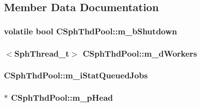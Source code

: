 \subsection{Member Data Documentation}
\hypertarget{classCSphThdPool_a2daa42b46c298c5b0f6875ad62f6ade6}{
\subsubsection[{m\-\_\-b\-Shutdown}]{\setlength{\rightskip}{0pt plus 5cm}volatile bool C\-Sph\-Thd\-Pool\-::m\-\_\-b\-Shutdown\hspace{0.3cm}{\ttfamily [private]}}}\label{classCSphThdPool_a2daa42b46c298c5b0f6875ad62f6ade6}
\hypertarget{classCSphThdPool_a9fbfebb75daea5b07050c6ae76f40f06}{
\subsubsection[{m\-\_\-d\-Workers}]{$<${\bf Sph\-Thread\-\_\-t}$>$ C\-Sph\-Thd\-Pool\-::m\-\_\-d\-Workers\hspace{0.3cm}{\ttfamily [private]}}}\label{classCSphThdPool_a9fbfebb75daea5b07050c6ae76f40f06}
\hypertarget{classCSphThdPool_ade216a20f82adfd0b52986c7f24fc822}{
\subsubsection[{m\-\_\-i\-Stat\-Queued\-Jobs}]{ C\-Sph\-Thd\-Pool\-::m\-\_\-i\-Stat\-Queued\-Jobs\hspace{0.3cm}{\ttfamily [private]}}}\label{classCSphThdPool_ade216a20f82adfd0b52986c7f24fc822}
\hypertarget{classCSphThdPool_a38b3c31b616e2c0392868f9ec92eb10f}{
\subsubsection[{m\-\_\-p\-Head}]{$\ast$ C\-Sph\-Thd\-Pool\-::m\-\_\-p\-Head\hspace{0.3cm}{\ttfamily [private]}}}\label{classCSphThdPool_a38b3c31b616e2c0392868f9ec92eb10f}
